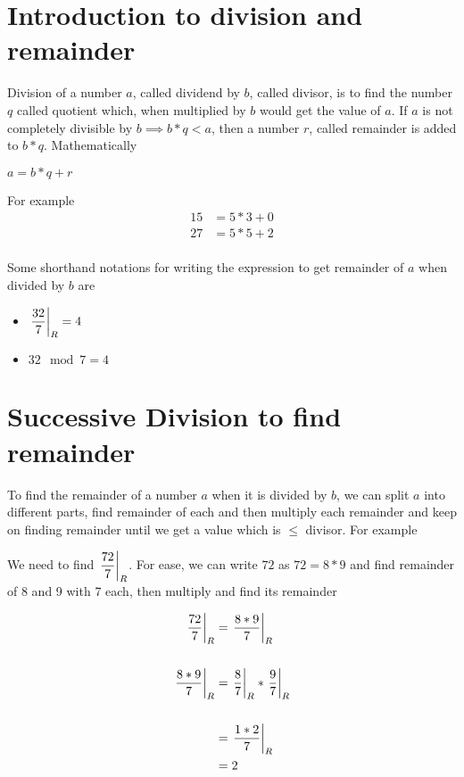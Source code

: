 \section{Introduction to division and remainder}

Division of a number $a$, called dividend by $b$, called divisor, is to find the number $q$ called quotient which, when multiplied by $b$ would get the value of $a$. If $a$ is not completely divisible by $b \implies b*q < a$, then a number $r$, called remainder is added to $b*q$. Mathematically

$a = b*q + r$

For example
\begin{align*}
    15 &= 5 * 3 + 0 \tag{a = 15, b = 5, q = 3, r = 0 } \\
    27 &= 5 * 5 + 2 \tag{a = 27, b = 5, q = 5, r = 2 } \\
\end{align*}

\begin{NOTE}
    Some shorthand notations for writing the expression to get remainder of $a$ when divided by $b$ are
    \begin{itemize}
        \item $\displaystyle{ \left. \frac{32}{7} \right |_{R} } = 4$
        \item $32 \mod 7 = 4$
    \end{itemize}
\end{NOTE}


\section{Successive Division to find remainder} \label{sec:rem-succ-division}

To find the remainder of a number $a$ when it is divided by $b$, we can split $a$ into different parts, find remainder of each and then multiply each remainder and keep on finding remainder until we get a value which is $\leq$ divisor. For example


We need to find $\displaystyle{ \left. \frac{72}{7} \right |_{R} }$. For ease, we can write $72$ as $72 = 8 * 9$ and find remainder of 8 and 9 with 7 each, then multiply and find its remainder

\begin{align*}
    \displaystyle{ \left. \frac{72}{7} \right |_{R} } &= \displaystyle{ \left. \frac{8 * 9}{7} \right |_{R} } \\ \\ 
    \displaystyle{ \left. \frac{8 * 9}{7} \right |_{R} } &= \displaystyle{ \left. \frac{8}{7} \right |_{R} } * \displaystyle{ \left. \frac{9}{7} \right |_{R} } \\ \\ 
    &= \displaystyle{ \left. \frac{1 * 2}{7} \right |_{R} } \\
    &= 2
\end{align*}

